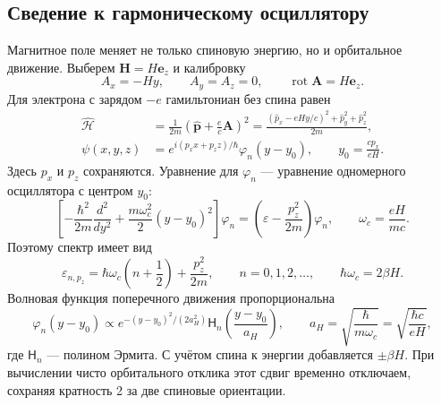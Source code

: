 \documentclass[../final.tex]{subfiles}
\begin{document}
\subsection{Сведение к гармоническому осциллятору}
Магнитное поле меняет не только спиновую энергию, но и орбитальное движение.
Выберем $\mathbf H=H\mathbf e_z$ и калибровку
\begin{equation*}
 A_x=-Hy,\qquad A_y=A_z=0,\qquad \operatorname{rot}\mathbf A=H\mathbf e_z.
\end{equation*}
Для электрона с зарядом $-e$ гамильтониан без спина равен
\begin{align*}
 \widehat{\mathcal H}
 &=\frac1{2m}\left(\widehat{\mathbf p}+\frac ec\mathbf A\right)^2
 =\frac{(\widehat p_x-eHy/c)^2+\widehat p_y^2+\widehat p_z^2}{2m},\\
 \psi(x,y,z)&=e^{i(p_xx+p_zz)/\hbar}\varphi_n(y-y_0),\qquad
 y_0=\frac{cp_x}{eH}.
\end{align*}
Здесь $p_x$ и $p_z$ сохраняются. Уравнение для $\varphi_n$ --- уравнение
одномерного осциллятора с центром $y_0$:
\begin{equation*}
 \left[-\frac{\hbar^2}{2m}\frac{d^2}{dy^2}
 +\frac{m\omega_c^2}{2}(y-y_0)^2\right]\varphi_n
 =\left(\varepsilon-\frac{p_z^2}{2m}\right)\varphi_n,
 \qquad\omega_c=\frac{eH}{mc}.
\end{equation*}
Поэтому спектр имеет вид
\begin{equation*}
 \varepsilon_{n,p_z}=\hbar\omega_c\left(n+\frac12\right)+\frac{p_z^2}{2m},
 \qquad n=0,1,2,\ldots,\qquad \hbar\omega_c=2\beta H.
\end{equation*}
Волновая функция поперечного движения пропорциональна
\begin{equation*}
 \varphi_n(y-y_0)\propto
 e^{-(y-y_0)^2/(2a_H^2)}\mathsf H_n\left(\frac{y-y_0}{a_H}\right),
 \qquad a_H=\sqrt{\frac{\hbar}{m\omega_c}}=\sqrt{\frac{\hbar c}{eH}},
\end{equation*}
где $\mathsf H_n$ --- полином Эрмита. С учётом спина к энергии добавляется
$\pm\beta H$. При вычислении чисто орбитального отклика этот сдвиг временно
отключаем, сохраняя кратность 2 за две спиновые ориентации.
\end{document}
